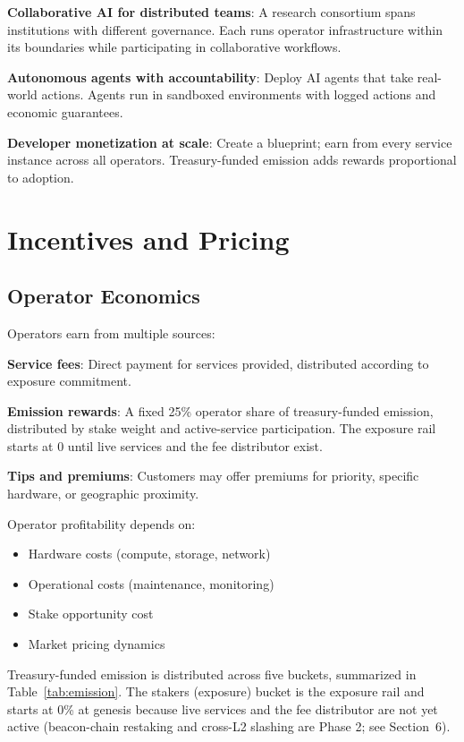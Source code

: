 \documentclass[11pt,a4paper]{article}
\begin{document}
\textbf{Collaborative AI for distributed teams}: A research consortium spans institutions with different governance. Each runs operator infrastructure within its boundaries while participating in collaborative workflows.

\textbf{Autonomous agents with accountability}: Deploy AI agents that take real-world actions. Agents run in sandboxed environments with logged actions and economic guarantees.

\textbf{Developer monetization at scale}: Create a blueprint; earn from every service instance across all operators. Treasury-funded emission adds rewards proportional to adoption.

\section{Incentives and Pricing}

\subsection{Operator Economics}

Operators earn from multiple sources:

\textbf{Service fees}: Direct payment for services provided, distributed according to exposure commitment.

\textbf{Emission rewards}: A fixed 25\% operator share of treasury-funded emission, distributed by stake weight and active-service participation. The exposure rail starts at 0 until live services and the fee distributor exist.

\textbf{Tips and premiums}: Customers may offer premiums for priority, specific hardware, or geographic proximity.

Operator profitability depends on:
\begin{itemize}[noitemsep]
    \item Hardware costs (compute, storage, network)
    \item Operational costs (maintenance, monitoring)
    \item Stake opportunity cost
    \item Market pricing dynamics
\end{itemize}

Treasury-funded emission is distributed across five buckets, summarized in Table~\ref{tab:emission}. The stakers (exposure) bucket is the exposure rail and starts at 0\% at genesis because live services and the fee distributor are not yet active (beacon-chain restaking and cross-L2 slashing are Phase 2; see Section~6).
\end{document}
